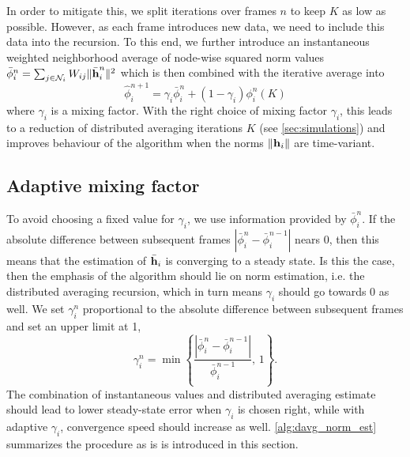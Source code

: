 \documentclass{article}
\begin{document}
In order to mitigate this, we split iterations over frames \(n\) to keep \(K\) as low as possible.
However, as each frame introduces new data, we need to include this data into the recursion.
To this end, we further introduce an instantaneous weighted neighborhood average of node-wise squared norm values \(\bar{\phi}_i^{n} = \sum_{j \in \mathcal{N}_i} W_{ij} \|\bar{\bm{\mathrm{h}}}_i^n\|^2\) which is then combined with the iterative average into
\begin{equation}
    \hat{\phi}_i^{n+1} = \gamma_i \bar{\phi}_i^{n} + (1-\gamma_i) \phi_i^{n}(K)
\end{equation}
where \(\gamma_i\) is a mixing factor.
With the right choice of mixing factor \(\gamma_i\), this leads to a reduction of distributed averaging iterations \(K\) (see \autoref{sec:simulations}) and improves behaviour of the algorithm when the norms \(\|\bm{\mathrm{h}}_i\|\) are time-variant.

\subsection[]{Adaptive mixing factor}
To avoid choosing a fixed value for \(\gamma_i\), we use information provided by \(\bar{\phi}_i^{n}\).
If the absolute difference between subsequent frames \(| \bar{\phi}_i^{n} - \bar{\phi}_i^{n-1} |\) nears 0, then this means that the estimation of \(\bar{\bm{\mathrm{h}}}_i\) is converging to a steady state.
Is this the case, then the emphasis of the algorithm should lie on norm estimation, i.e. the distributed averaging recursion, which in turn means \(\gamma_i\) should go towards 0 as well.
We set \(\gamma_i^{n}\) proportional to the absolute difference between subsequent frames and set an upper limit at 1,
\begin{equation}
    \gamma_i^{n} = \min \left\lbrace \frac{| \bar{\phi}_i^{n} - \bar{\phi}_i^{n-1} |}{\bar{\phi}_i^{n-1}},\,1\right\rbrace.\label{eq:adaptivenormest:adaptivegamma}
\end{equation}
The combination of instantaneous values and distributed averaging estimate should lead to lower steady-state error when \(\gamma_i\) is chosen right, while with adaptive \(\gamma_i\), convergence speed should increase as well.
\autoref{alg:davg_norm_est} summarizes the procedure as is is introduced in this section.
\end{document}

